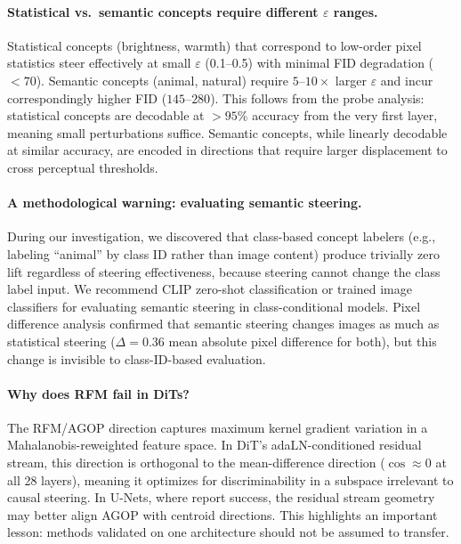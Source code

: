 \documentclass{article}
\theoremstyle{definition}
\begin{document}
\paragraph{Statistical vs.\ semantic concepts require different $\varepsilon$ ranges.}
Statistical concepts (brightness, warmth) that correspond to low-order pixel statistics steer effectively at small $\varepsilon$ (0.1--0.5) with minimal FID degradation ($<70$).
Semantic concepts (animal, natural) require $5$--$10\times$ larger $\varepsilon$ and incur correspondingly higher FID ($145$--$280$).
This follows from the probe analysis: statistical concepts are decodable at $>95\%$ accuracy from the very first layer, meaning small perturbations suffice.
Semantic concepts, while linearly decodable at similar accuracy, are encoded in directions that require larger displacement to cross perceptual thresholds.

\paragraph{A methodological warning: evaluating semantic steering.}
During our investigation, we discovered that class-based concept labelers (e.g., labeling ``animal'' by class ID rather than image content) produce trivially zero lift regardless of steering effectiveness, because steering cannot change the class label input.
We recommend CLIP zero-shot classification or trained image classifiers for evaluating semantic steering in class-conditional models.
Pixel difference analysis confirmed that semantic steering changes images as much as statistical steering ($\Delta = 0.36$ mean absolute pixel difference for both), but this change is invisible to class-ID-based evaluation.

\paragraph{Why does RFM fail in DiTs?}
The RFM/AGOP direction captures maximum kernel gradient variation in a Mahalanobis-reweighted feature space.
In DiT's adaLN-conditioned residual stream, this direction is orthogonal to the mean-difference direction ($\cos \approx 0$ at all 28 layers), meaning it optimizes for discriminability in a subspace irrelevant to causal steering.
In U-Nets, where \citet{wang2026general} report success, the residual stream geometry may better align AGOP with centroid directions.
This highlights an important lesson: methods validated on one architecture should not be assumed to transfer.
\end{document}
